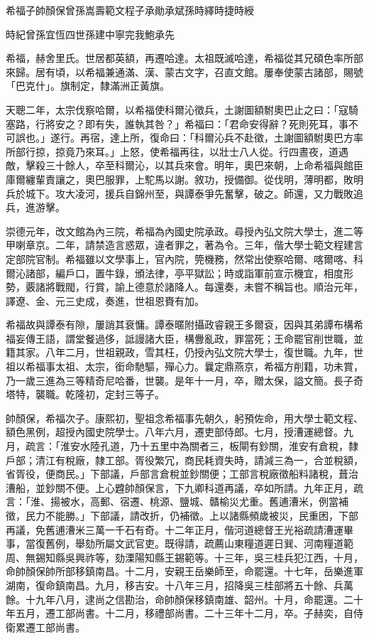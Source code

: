 
\begin{pinyinscope}
希福子帥顏保曾孫嵩壽範文程子承勛承斌孫時繹時捷時綬

時紀曾孫宜恆四世孫建中寧完我鮑承先

希福，赫舍里氏。世居都英額，再遷哈達。太祖既滅哈達，希福從其兄碩色率所部來歸。居有頃，以希福兼通滿、漢、蒙古文字，召直文館。屢奉使蒙古諸部，賜號「巴克什」。旗制定，隸滿洲正黃旗。

天聰二年，太宗伐察哈爾，以希福使科爾沁徵兵，土謝圖額駙奧巴止之曰：「寇騎塞路，行將安之？即有失，誰執其咎？」希福曰：「君命安得辭？死則死耳，事不可誤也。」遂行。再宿，達上所，復命曰：「科爾沁兵不赴徵，土謝圖額駙奧巴方率所部行掠，掠竟乃來耳。」上怒，使希福再往，以壯士八人從。行四晝夜，道遇敵，擊殺三十餘人，卒至科爾沁，以其兵來會。明年，奧巴來朝，上命希福與館臣庫爾纏輩責讓之，奧巴服罪，上駝馬以謝。敘功，授備御。從伐明，薄明都，敗明兵於城下。攻大凌河，援兵自錦州至，與譚泰爭先奮擊，破之。師還，又力戰敗追兵，進游擊。

崇德元年，改文館為內三院，希福為內國史院承政。尋授內弘文院大學士，進二等甲喇章京。二年，請禁造言惑眾，違者罪之，著為令。三年，偕大學士範文程建言定部院官制。希福雖以文學事上，官內院，筦機務，然常出使察哈爾、喀爾喀、科爾沁諸部，編戶口，置牛錄，頒法律，亭平獄訟；時或詣軍前宣示機宜，相度形勢，覈諸將戰閥，行賞，諭上德意於諸降人。每還奏，未嘗不稱旨也。順治元年，譯遼、金、元三史成，奏進，世祖恩賚有加。

希福故與譚泰有隙，屢誚其衰慵。譚泰暱附攝政睿親王多爾袞，因與其弟譚布構希福妄傳王語，謂堂餐過侈，詆謾諸大臣，構釁亂政，罪當死；王命罷官削世職，並籍其家。八年二月，世祖親政，雪其枉，仍授內弘文院大學士，復世職。九年，世祖以希福事太祖、太宗，銜命馳驅，殫心力。曩定鼎燕京，希福方削籍，功未賞，乃一歲三進為三等精奇尼哈番，世襲。是年十一月，卒，贈太保，謚文簡。長子奇塔特，襲職。乾隆初，定封三等子。

帥顏保，希福次子。康熙初，聖祖念希福事先朝久，躬預佐命，用大學士範文程、額色黑例，超授內國史院學士。八年六月，遷吏部侍郎。七月，授漕運總督。九月，疏言：「淮安水陸孔道，乃十五里中為關者三，板閘有鈔關，淮安有倉稅，隸戶部；清江有稅廠，隸工部。胥役繁冗，商民耗資失時，請減三為一，合並稅額，省胥役，便商民。」下部議，戶部言倉稅並鈔關便；工部言稅廠徵船料諸稅，葺治漕船，並鈔關不便。上心韙帥顏保言，下九卿科道再議，卒如所請。九年正月，疏言：「淮、揚被水，高郵、宿遷、桃源、鹽城、贛榆災尤重。舊逋漕米，例當補徵，民力不能勝。」下部議，請改折，仍補徵。上以諸縣頻歲被災，民重困，下部再議，免舊逋漕米三萬一千石有奇。十二年正月，偕河道總督王光裕疏請漕運畢事，當復舊例，舉劾所屬文武官吏。既得請，疏薦山東糧道遲日巽、河南糧道範周、無錫知縣吳興祚等，劾溧陽知縣王錫範等。十三年，吳三桂兵犯江西，十月，命帥顏保帥所部移鎮南昌。十二月，安親王岳樂師至，命罷還。十七年，岳樂進軍湖南，復命鎮南昌。九月，移吉安。十八年三月，招降吳三桂部將五十餘、兵萬餘。十九年八月，逮尚之信勘治，命帥顏保移鎮南雄、韶州。十月，命罷還。二十年五月，遷工部尚書。十二月，移禮部尚書。二十三年十二月，卒。子赫奕，自侍衛累遷工部尚書。


\end{pinyinscope}
